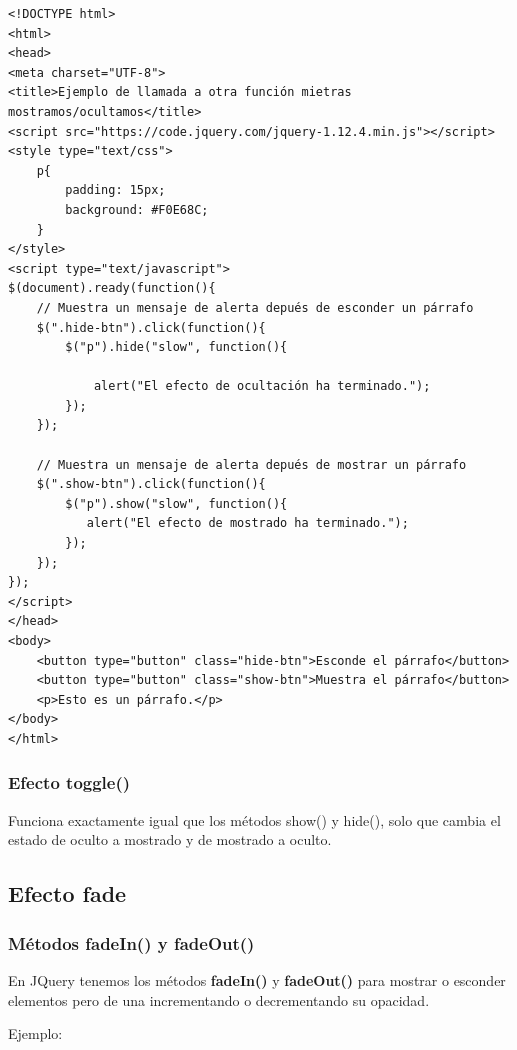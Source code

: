 \documentclass[a4paper, oneside]{article}
\begin{document}
\begin{verbatim}
<!DOCTYPE html>
<html>
<head>
<meta charset="UTF-8">
<title>Ejemplo de llamada a otra función mietras mostramos/ocultamos</title>
<script src="https://code.jquery.com/jquery-1.12.4.min.js"></script>
<style type="text/css">
    p{
        padding: 15px;
        background: #F0E68C;
    }
</style>
<script type="text/javascript">
$(document).ready(function(){
    // Muestra un mensaje de alerta depués de esconder un párrafo
    $(".hide-btn").click(function(){
        $("p").hide("slow", function(){

            alert("El efecto de ocultación ha terminado.");
        });
    });

    // Muestra un mensaje de alerta depués de mostrar un párrafo
    $(".show-btn").click(function(){
        $("p").show("slow", function(){
           alert("El efecto de mostrado ha terminado.");
        });
    });
});
</script>
</head>
<body>
    <button type="button" class="hide-btn">Esconde el párrafo</button> 
    <button type="button" class="show-btn">Muestra el párrafo</button>
    <p>Esto es un párrafo.</p>
</body>
</html>                                		
\end{verbatim}

\subsubsection{Efecto toggle()}
\label{sec:orgd000a41}

Funciona exactamente igual que los métodos show() y hide(), solo que cambia el estado de oculto a mostrado y de mostrado a oculto.

\subsection{Efecto fade}
\label{sec:orgb81acaf}

\subsubsection{Métodos fadeIn() y fadeOut()}
\label{sec:org2a1155e}

En JQuery tenemos los métodos \textbf{fadeIn()} y \textbf{fadeOut()} para mostrar o esconder elementos pero de una incrementando o decrementando su opacidad.

Ejemplo:
\end{document}
